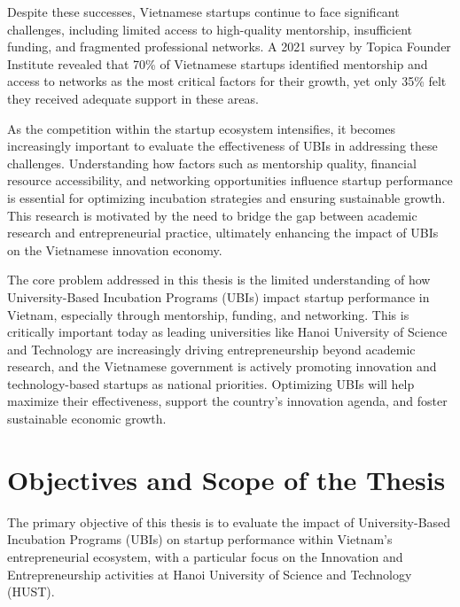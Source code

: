 \documentclass[../Main.tex]{subfiles}
\begin{document}
	Despite these successes, Vietnamese startups continue to face significant challenges, including limited access to high-quality mentorship, insufficient funding, and fragmented professional networks. A 2021 survey by Topica Founder Institute revealed that 70\% of Vietnamese startups identified mentorship and access to networks as the most critical factors for their growth, yet only 35\% felt they received adequate support in these areas.

	As the competition within the startup ecosystem intensifies, it becomes increasingly important to evaluate the effectiveness of UBIs in addressing these challenges. Understanding how factors such as mentorship quality, financial resource accessibility, and networking opportunities influence startup performance is essential for optimizing incubation strategies and ensuring sustainable growth. This research is motivated by the need to bridge the gap between academic research and entrepreneurial practice, ultimately enhancing the impact of UBIs on the Vietnamese innovation economy.

	\begin{condensed_idea}
		The core problem addressed in this thesis is the limited understanding of how University-Based Incubation Programs (UBIs) impact startup performance in Vietnam, especially through mentorship, funding, and networking. This is critically important today as leading universities like Hanoi University of Science and Technology are increasingly driving entrepreneurship beyond academic research, and the Vietnamese government is actively promoting innovation and technology-based startups as national priorities. Optimizing UBIs will help maximize their effectiveness, support the country's innovation agenda, and foster sustainable economic growth.
	\end{condensed_idea}
		

	\section{Objectives and Scope of the Thesis}
	\label{section:1.2_Objectives_and_scope_of_the_thesis}

	The primary objective of this thesis is to evaluate the impact of University-Based Incubation Programs (UBIs) on startup performance within Vietnam's entrepreneurial ecosystem, with a particular focus on the Innovation and Entrepreneurship activities at Hanoi University of Science and Technology (HUST).
\end{document}
